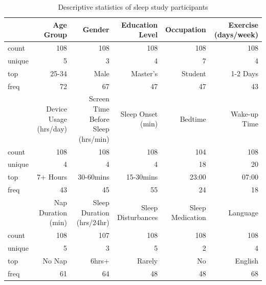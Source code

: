 \documentclass[conference]{IEEEtran}
\begin{document}
\begin{table}
    \centering
    \caption{Descriptive statistics of sleep study participants}
    \label{tab:sleep_data2}
    \begin{tabular}{lrrrrr}
        \hline
               & Age Group              & Gender                             & Education Level    & Occupation       & Exercise (days/week) \\ \hline
        count  & 108                    & 108                                & 108                & 108              & 108                  \\
        unique & 5                      & 3                                  & 4                  & 7                & 4                    \\
        top    & 25-34                  & Male                               & Master's           & Student          & 1-2 Days             \\
        freq   & 72                     & 67                                 & 47                 & 47               & 43                   \\ \hline
               & Device Usage (hrs/day) & Screen Time Before Sleep (hrs/min) & Sleep Onset (min)  & Bedtime          & Wake-up Time         \\ \hline
        count  & 108                    & 108                                & 108                & 104              & 108                  \\
        unique & 4                      & 4                                  & 4                  & 18               & 20                   \\
        top    & 7+ Hours               & 30-60mins                          & 15-30mins          & 23:00            & 07:00                \\
        freq   & 43                     & 45                                 & 55                 & 24               & 18                   \\ \hline

               & Nap Duration (min)     & Sleep Duration (hrs/24hr)          & Sleep Disturbances & Sleep Medication & Language             \\ \hline
        count  & 108                    & 107                                & 108                & 108              & 108                  \\
        unique & 5                      & 3                                  & 5                  & 2                & 4                    \\
        top    & No Nap                 & 6hrs+                              & Rarely             & No               & English              \\
        freq   & 61                     & 64                                 & 48                 & 48               & 68                   \\ \hline
    \end{tabular}
\end{table}
\end{document}
